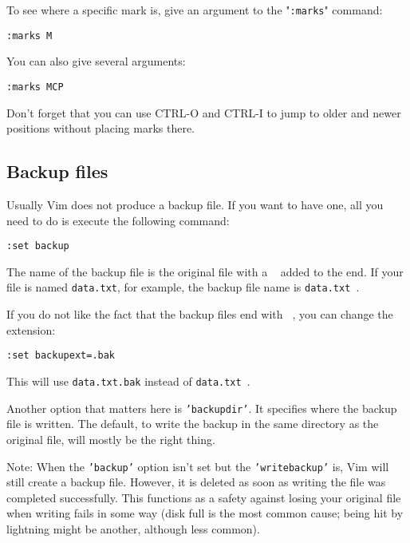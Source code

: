 To see where a specific mark is, give an argument to the "\texttt{:marks}" command:

 \begin{Verbatim}[samepage=true]
 :marks M
 \end{Verbatim}

You can also give several arguments:

 \begin{Verbatim}[samepage=true]
 :marks MCP
 \end{Verbatim}

Don't forget that you can use CTRL-O and CTRL-I to jump to older and newer positions without placing marks there.

\subsection{Backup files}
\label{Backup files}
Usually Vim does not produce a backup file.
If you want to have one, all you need to do is execute the following command:

 \begin{Verbatim}[samepage=true]
 :set backup
 \end{Verbatim}

The name of the backup file is the original file with a  \texttt{~}  added to the end.
If your file is named \texttt{data.txt}, for example, the backup file name is \texttt{data.txt~}.

If you do not like the fact that the backup files end with \texttt{~}, you can change the extension:

 \begin{Verbatim}[samepage=true]
 :set backupext=.bak
 \end{Verbatim}

This will use \texttt{data.txt.bak} instead of \texttt{data.txt~}.

Another option that matters here is \texttt{'backupdir'}.
It specifies where the backup file is written.
The default, to write the backup in the same directory as the original file, will mostly be the right thing.

Note: When the \texttt{'backup'} option isn't set but the \texttt{'writebackup'} is, Vim will still create a backup file.
However, it is deleted as soon as writing the file was completed successfully.
This functions as a safety against losing your original file when writing fails in some way (disk full is the most common cause; being hit by lightning might be another, although less common).

